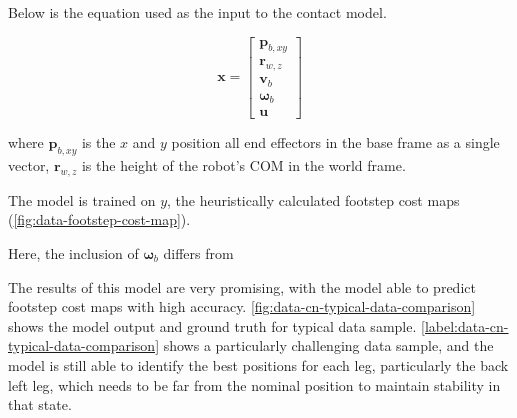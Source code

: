 Below is the equation used as the input to the contact model.

\[
  \mathbf{x} =
  \begin{bmatrix}
    \mathbf p_{b,xy} \\
    \mathbf r_{w,z} \\
    \mathbf v_b \\
    \mathbf \omega_b \\
    \mathbf u
  \end{bmatrix}
\]

where
$\mathbf p_{b,xy}$ is the $x$ and $y$ position all end effectors in
the base frame as a single vector,
$\mathbf r_{w,z}$ is the height of the robot's COM in the world frame.

The model is trained on $y$, the heuristically calculated footstep
cost maps (\autoref{fig:data-footstep-cost-map}).

Here, the inclusion of $\mathbf \omega_b$ differs from
\cite{bratta_contactnet_2024}

The results of this model are very promising, with the model able to
predict footstep cost maps with high accuracy.
\autoref{fig:data-cn-typical-data-comparison}
shows the model output and ground truth for typical data sample.
\autoref{label:data-cn-typical-data-comparison}
shows a particularly challenging data sample, and the model is still
able to identify the best positions for each leg,
particularly the back left leg, which needs to be far from the
nominal position to maintain stability in that state.

